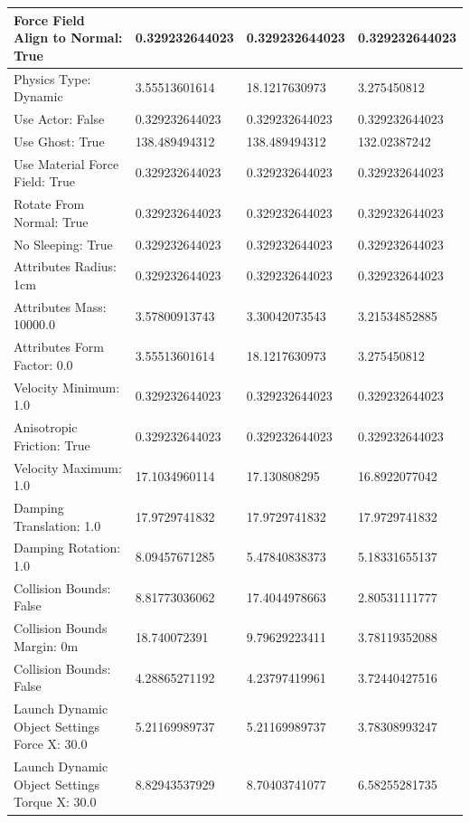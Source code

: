 \begin{table}[htbp]
\begin{tabular}{ | l || l | l | l | }
Force Field Align to Normal: True & 0.329232644023  & 0.329232644023  & 0.329232644023 \\ \hline
Physics Type: Dynamic & 3.55513601614  & 18.1217630973  & 3.275450812 \\ \hline
\rowcolor{cyan}
Use Actor: False & 0.329232644023  & 0.329232644023  & 0.329232644023 \\ \hline
Use Ghost: True & 138.489494312  & 138.489494312  & 132.02387242 \\ \hline
\rowcolor{cyan}
Use Material Force Field: True & 0.329232644023  & 0.329232644023  & 0.329232644023 \\ \hline
\rowcolor{cyan}
Rotate From Normal: True & 0.329232644023  & 0.329232644023  & 0.329232644023 \\ \hline
\rowcolor{cyan}
No Sleeping: True & 0.329232644023  & 0.329232644023  & 0.329232644023 \\ \hline
\rowcolor{cyan}
Attributes Radius: 1cm & 0.329232644023  & 0.329232644023  & 0.329232644023 \\ \hline
Attributes Mass: 10000.0 & 3.57800913743  & 3.30042073543  & 3.21534852885 \\ \hline
Attributes Form Factor: 0.0 & 3.55513601614  & 18.1217630973  & 3.275450812 \\ \hline
\rowcolor{cyan}
Velocity Minimum: 1.0 & 0.329232644023  & 0.329232644023  & 0.329232644023 \\ \hline
\rowcolor{cyan}
Anisotropic Friction: True & 0.329232644023  & 0.329232644023  & 0.329232644023 \\ \hline
Velocity Maximum: 1.0 & 17.1034960114  & 17.130808295  & 16.8922077042 \\ \hline
Damping Translation: 1.0 & 17.9729741832 & 17.9729741832 & 17.9729741832 \\ \hline
Damping Rotation: 1.0 & 8.09457671285 & 5.47840838373 & 5.18331655137 \\ \hline
Collision Bounds: False & 8.81773036062 & 17.4044978663 & 2.80531111777 \\ \hline
Collision Bounds Margin: 0m & 18.740072391  & 9.79629223411  & 3.78119352088 \\ \hline
Collision Bounds: False & 4.28865271192  & 4.23797419961  & 3.72440427516 \\ \hline
Launch Dynamic Object Settings Force X: 30.0 & 5.21169989737  & 5.21169989737  & 3.78308993247 \\ \hline
Launch Dynamic Object Settings Torque X: 30.0 & 8.82943537929  & 8.70403741077  & 6.58255281735 \\ \hline

\end{tabular}
\end{table}
